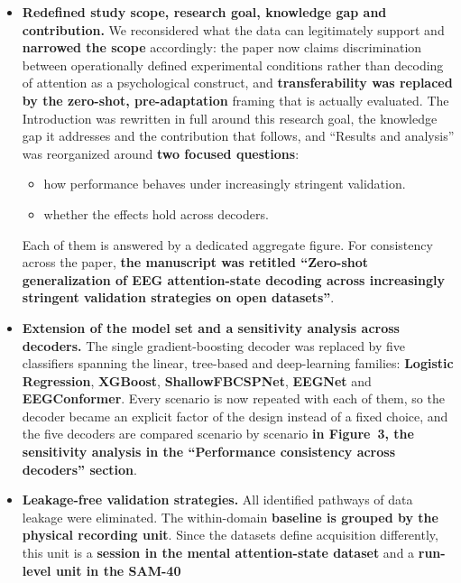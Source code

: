 \documentclass{article}
\begin{document}
\begin{itemize}
	\item \textbf{Redefined study scope, research goal, knowledge gap and
	      contribution.} We reconsidered what the data can legitimately support
	      and \textbf{narrowed the scope} accordingly: the paper now claims
	      discrimination between operationally defined experimental conditions
	      rather than decoding of attention as a psychological construct, and
	      \textbf{transferability was replaced by the zero-shot, pre-adaptation}
	      framing that is actually evaluated. The Introduction was rewritten in
	      full around this research goal, the knowledge gap it addresses and the
	      contribution that follows, and ``Results and analysis'' was reorganized
	      around \textbf{two focused questions}:
	      \begin{itemize}
		      \item how performance behaves under increasingly stringent
		            validation.
		      \item whether the effects hold across decoders.
	      \end{itemize}
	      Each of them is answered by a dedicated aggregate figure. For
	      consistency across the paper, \textbf{the manuscript was retitled
	      ``Zero-shot generalization of EEG attention-state decoding across
	      increasingly stringent validation strategies on open datasets''}.
	\item \textbf{Extension of the model set and a sensitivity analysis across
	      decoders.} The single gradient-boosting decoder was replaced by five
	      classifiers spanning the linear, tree-based and deep-learning
	      families: \textbf{Logistic Regression}, \textbf{XGBoost},
	      \textbf{ShallowFBCSPNet}, \textbf{EEGNet} and \textbf{EEGConformer}.
	      Every scenario is now repeated with each of them, so the decoder
	      became an explicit factor of the design instead of a fixed choice, and
	      the five decoders are compared scenario by scenario \textbf{in
	      Figure~3, the sensitivity analysis in the ``Performance consistency
	      across decoders'' section}.
	\item \textbf{Leakage-free validation strategies.} All identified pathways
	      of data leakage were eliminated. The within-domain \textbf{baseline is
	      grouped by the physical recording unit}. Since the datasets define
	      acquisition differently, this unit is a \textbf{session in the mental
	      attention-state dataset} and a \textbf{run-level unit in the SAM-40
}
\end{itemize}
\end{document}
